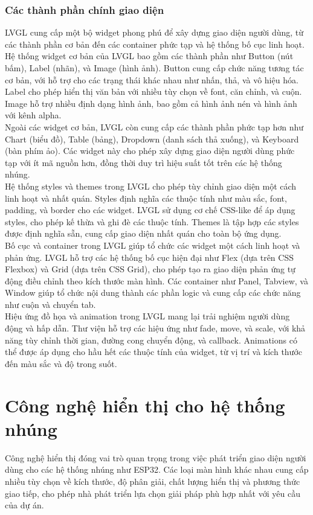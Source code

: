 \subsubsection{Các thành phần chính giao diện}
\tab LVGL cung cấp một bộ widget phong phú để xây dựng giao diện người dùng, từ các thành phần cơ bản đến các container phức tạp và hệ thống bố cục linh hoạt.\\
Hệ thống widget cơ bản của LVGL bao gồm các thành phần như Button (nút bấm), Label (nhãn), và Image (hình ảnh). Button cung cấp chức năng tương tác cơ bản, với hỗ trợ cho các trạng thái khác nhau như nhấn, thả, và vô hiệu hóa. Label cho phép hiển thị văn bản với nhiều tùy chọn về font, căn chỉnh, và cuộn. Image hỗ trợ nhiều định dạng hình ảnh, bao gồm cả hình ảnh nén và hình ảnh với kênh alpha.\\
\tab Ngoài các widget cơ bản, LVGL còn cung cấp các thành phần phức tạp hơn như Chart (biểu đồ), Table (bảng), Dropdown (danh sách thả xuống), và Keyboard (bàn phím ảo). Các widget này cho phép xây dựng giao diện người dùng phức tạp với ít mã nguồn hơn, đồng thời duy trì hiệu suất tốt trên các hệ thống nhúng.\\
\tab Hệ thống styles và themes trong LVGL cho phép tùy chỉnh giao diện một cách linh hoạt và nhất quán. Styles định nghĩa các thuộc tính như màu sắc, font, padding, và border cho các widget. LVGL sử dụng cơ chế CSS-like để áp dụng styles, cho phép kế thừa và ghi đè các thuộc tính. Themes là tập hợp các styles được định nghĩa sẵn, cung cấp giao diện nhất quán cho toàn bộ ứng dụng.\\
\tab Bố cục và container trong LVGL giúp tổ chức các widget một cách linh hoạt và phản ứng. LVGL hỗ trợ các hệ thống bố cục hiện đại như Flex (dựa trên CSS Flexbox) và Grid (dựa trên CSS Grid), cho phép tạo ra giao diện phản ứng tự động điều chỉnh theo kích thước màn hình. Các container như Panel, Tabview, và Window giúp tổ chức nội dung thành các phần logic và cung cấp các chức năng như cuộn và chuyển tab.\\
\tab Hiệu ứng đồ họa và animation trong LVGL mang lại trải nghiệm người dùng động và hấp dẫn. Thư viện hỗ trợ các hiệu ứng như fade, move, và scale, với khả năng tùy chỉnh thời gian, đường cong chuyển động, và callback. Animations có thể được áp dụng cho hầu hết các thuộc tính của widget, từ vị trí và kích thước đến màu sắc và độ trong suốt.
\section{Công nghệ hiển thị cho hệ thống nhúng}
\tab Công nghệ hiển thị đóng vai trò quan trọng trong việc phát triển giao diện người dùng cho các hệ thống nhúng như ESP32. Các loại màn hình khác nhau cung cấp nhiều tùy chọn về kích thước, độ phân giải, chất lượng hiển thị và phương thức giao tiếp, cho phép nhà phát triển lựa chọn giải pháp phù hợp nhất với yêu cầu của dự án.
